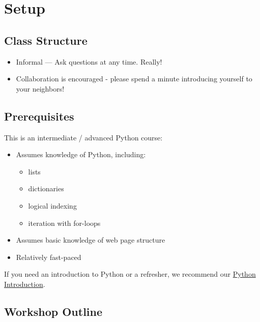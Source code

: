\documentclass[
]{book}
\providecommand{\tightlist}{%
  \setlength{\itemsep}{0pt}\setlength{\parskip}{0pt}}
\begin{document}
\hypertarget{setup-5}{%
\section{Setup}\label{setup-5}}

\hypertarget{class-structure-5}{%
\subsection{Class Structure}\label{class-structure-5}}

\begin{itemize}
\tightlist
\item
  Informal --- Ask questions at any time. Really!
\item
  Collaboration is encouraged - please spend a minute introducing yourself to your neighbors!
\end{itemize}

\hypertarget{prerequisites-5}{%
\subsection{Prerequisites}\label{prerequisites-5}}

This is an intermediate / advanced Python course:

\begin{itemize}
\tightlist
\item
  Assumes knowledge of Python, including:

  \begin{itemize}
  \tightlist
  \item
    lists
  \item
    dictionaries
  \item
    logical indexing
  \item
    iteration with for-loops
  \end{itemize}
\item
  Assumes basic knowledge of web page structure
\item
  Relatively fast-paced
\end{itemize}

If you need an introduction to Python or a refresher, we recommend our
\href{https://iqss.github.io/dss-workshops/PythonIntro.html}{Python Introduction}.

\hypertarget{workshop-outline-2}{%
\subsection{Workshop Outline}\label{workshop-outline-2}}
\end{document}
